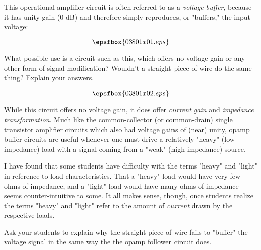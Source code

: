 

This operational amplifier circuit is often referred to as a {\it voltage buffer}, because it has unity gain (0 dB) and therefore simply reproduces, or "buffers," the input voltage:

$$\epsfbox{03801x01.eps}$$

What possible use is a circuit such as this, which offers no voltage gain or any other form of signal modification?  Wouldn't a straight piece of wire do the same thing?  Explain your answers.

$$\epsfbox{03801x02.eps}$$







While this circuit offers no voltage gain, it does offer {\it current gain} and {\it impedance transformation}.  Much like the common-collector (or common-drain) single transistor amplifier circuits which also had voltage gains of (near) unity, opamp buffer circuits are useful whenever one must drive a relatively "heavy" (low impedance) load with a signal coming from a "weak" (high impedance) source.







I have found that some students have difficulty with the terms "heavy" and "light" in reference to load characteristics.  That a "heavy" load would have very few ohms of impedance, and a "light" load would have many ohms of impedance seems counter-intuitive to some.  It all makes sense, though, once students realize the terms "heavy" and "light" refer to the amount of {\it current} drawn by the respective loads.

Ask your students to explain why the straight piece of wire fails to "buffer" the voltage signal in the same way the the opamp follower circuit does.




